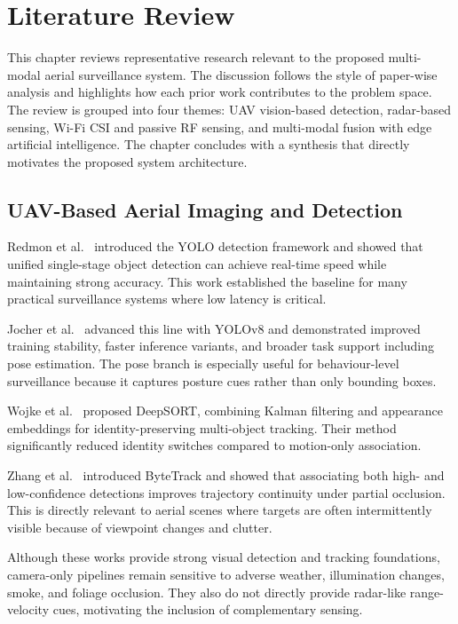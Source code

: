 \chapter{Literature Review}
\label{Literature_Review}

This chapter reviews representative research relevant to the proposed multi-modal aerial surveillance system. The discussion follows the style of paper-wise analysis and highlights how each prior work contributes to the problem space. The review is grouped into four themes: UAV vision-based detection, radar-based sensing, Wi-Fi CSI and passive RF sensing, and multi-modal fusion with edge artificial intelligence. The chapter concludes with a synthesis that directly motivates the proposed system architecture.

\section{UAV-Based Aerial Imaging and Detection}

Redmon et al.~\cite{redmon2016yolo} introduced the YOLO detection framework and showed that unified single-stage object detection can achieve real-time speed while maintaining strong accuracy. This work established the baseline for many practical surveillance systems where low latency is critical.

Jocher et al.~\cite{jocher2023yolov8} advanced this line with YOLOv8 and demonstrated improved training stability, faster inference variants, and broader task support including pose estimation. The pose branch is especially useful for behaviour-level surveillance because it captures posture cues rather than only bounding boxes.

Wojke et al.~\cite{wojke2017deepsort} proposed DeepSORT, combining Kalman filtering and appearance embeddings for identity-preserving multi-object tracking. Their method significantly reduced identity switches compared to motion-only association.

Zhang et al.~\cite{zhang2022bytetrack} introduced ByteTrack and showed that associating both high- and low-confidence detections improves trajectory continuity under partial occlusion. This is directly relevant to aerial scenes where targets are often intermittently visible because of viewpoint changes and clutter.

Although these works provide strong visual detection and tracking foundations, camera-only pipelines remain sensitive to adverse weather, illumination changes, smoke, and foliage occlusion. They also do not directly provide radar-like range-velocity cues, motivating the inclusion of complementary sensing.

